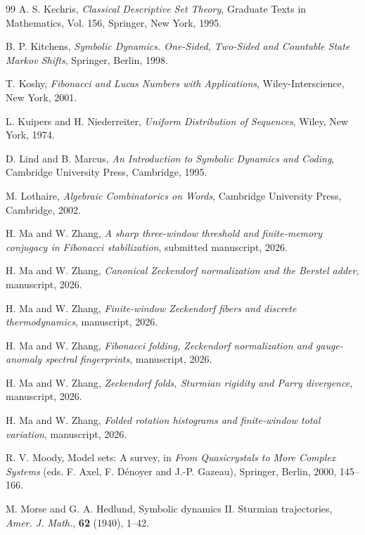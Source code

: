 \begin{thebibliography}{99}
A. S. Kechris, \textit{Classical Descriptive Set Theory}, Graduate Texts in Mathematics, Vol. 156, Springer, New York, 1995.

B. P. Kitchens, \textit{Symbolic Dynamics. One-Sided, Two-Sided and Countable State Markov Shifts}, Springer, Berlin, 1998.

T. Koshy, \textit{Fibonacci and Lucas Numbers with Applications}, Wiley-Interscience, New York, 2001.

L. Kuipers and H. Niederreiter, \textit{Uniform Distribution of Sequences}, Wiley, New York, 1974.

D. Lind and B. Marcus, \textit{An Introduction to Symbolic Dynamics and Coding}, Cambridge University Press, Cambridge, 1995.

M. Lothaire, \textit{Algebraic Combinatorics on Words}, Cambridge University Press, Cambridge, 2002.

H. Ma and W. Zhang, \textit{A sharp three-window threshold and finite-memory conjugacy in Fibonacci stabilization}, submitted manuscript, 2026.

H. Ma and W. Zhang, \textit{Canonical Zeckendorf normalization and the Berstel adder}, manuscript, 2026.

H. Ma and W. Zhang, \textit{Finite-window Zeckendorf fibers and discrete thermodynamics}, manuscript, 2026.

H. Ma and W. Zhang, \textit{Fibonacci folding, Zeckendorf normalization and gauge-anomaly spectral fingerprints}, manuscript, 2026.

H. Ma and W. Zhang, \textit{Zeckendorf folds, Sturmian rigidity and Parry divergence}, manuscript, 2026.

H. Ma and W. Zhang, \textit{Folded rotation histograms and finite-window total variation}, manuscript, 2026.

R. V. Moody, Model sets: A survey, in \textit{From Quasicrystals to More Complex Systems} (eds. F. Axel, F. D\'enoyer and J.-P. Gazeau), Springer, Berlin, 2000, 145--166.

M. Morse and G. A. Hedlund, Symbolic dynamics II. Sturmian trajectories, \textit{Amer. J. Math.}, \textbf{62} (1940), 1--42.


\end{thebibliography}
